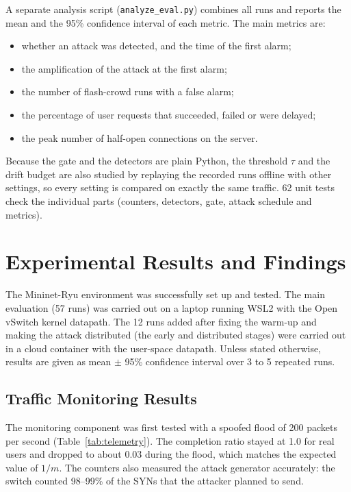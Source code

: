 \documentclass[12pt,a4paper]{article}
\begin{document}
A separate analysis script (\texttt{analyze\_eval.py}) combines all runs and
reports the mean and the 95\% confidence interval of each metric. The main
metrics are:
\begin{itemize}
  \item whether an attack was detected, and the time of the first alarm;
  \item the amplification of the attack at the first alarm;
  \item the number of flash-crowd runs with a false alarm;
  \item the percentage of user requests that succeeded, failed or were delayed;
  \item the peak number of half-open connections on the server.
\end{itemize}
Because the gate and the detectors are plain Python, the threshold $\tau$ and
the drift budget are also studied by replaying the recorded runs offline with
other settings, so every setting is compared on exactly the same traffic. 62
unit tests check the individual parts (counters, detectors, gate, attack
schedule and metrics).

\newpage
\section{Experimental Results and Findings}
The Mininet-Ryu environment was successfully set up and tested. The main
evaluation (57 runs) was carried out on a laptop running WSL2 with the Open
vSwitch kernel datapath. The 12 runs added after fixing the warm-up and making
the attack distributed (the early and distributed stages) were carried out in a
cloud container with the user-space datapath. Unless stated otherwise, results
are given as mean $\pm$ 95\% confidence interval over 3 to 5 repeated runs.

\subsection{Traffic Monitoring Results}
The monitoring component was first tested with a spoofed flood of 200 packets
per second (Table~\ref{tab:telemetry}). The completion ratio stayed at 1.0 for
real users and dropped to about 0.03 during the flood, which matches the
expected value of $1/m$. The counters also measured the attack generator
accurately: the switch counted 98--99\% of the SYNs that the attacker planned
to send.
\end{document}
